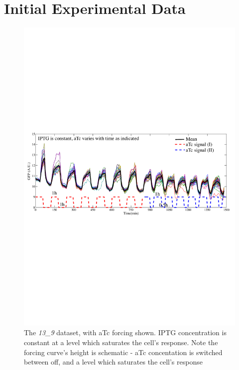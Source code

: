 \documentclass[10pt,journal]{./IEEE_latex_class/IEEEtran}
\begin{document}
\appendices
\renewcommand\thefigure{\thesection.\arabic{figure}}  


\section{Initial Experimental Data}
\label{Initial Experimental Data}
\setcounter{figure}{0}    

\begin{figure}[h]
\centering
\includegraphics[trim = 0 310 0 300 , scale = 0.7, clip = true]{13_9}
\caption{The \textit{13\_9} dataset, with aTc forcing shown. IPTG concentration is constant at a level which saturates the cell's response. Note the forcing curve's height is schematic - aTc concentation is switched between off, and a level which saturates the cell's response}
\label{}
\end{figure}
\end{document}
